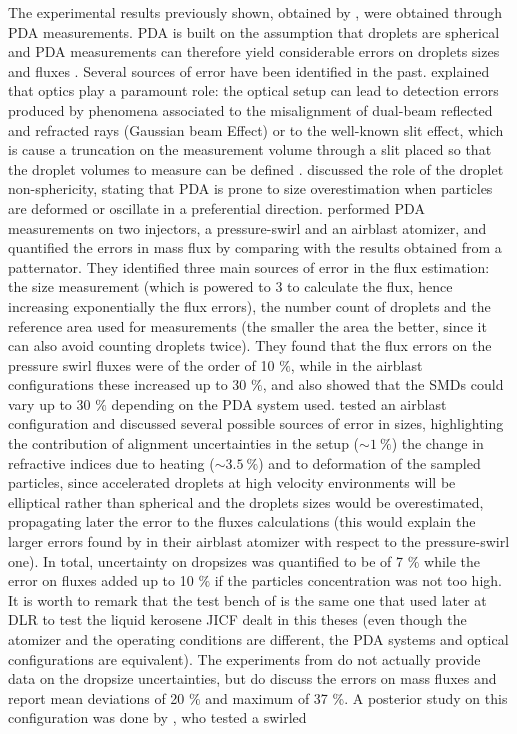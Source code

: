 The experimental results previously shown, obtained by , were obtained through PDA measurements. PDA is built on the assumption that droplets are spherical and PDA measurements can therefore yield considerable errors on droplets sizes and fluxes . Several sources of error have been identified in the past.  explained that optics play a paramount role: the optical setup can lead to detection errors produced by phenomena associated to the misalignment of dual-beam reflected and refracted rays (Gaussian beam Effect) or to the well-known slit effect, which is cause a truncation on the measurement volume through a slit placed so that the droplet volumes to measure can be defined .  discussed the role of the droplet non-sphericity, stating that PDA is prone to size overestimation when particles are deformed or oscillate in a preferential direction.  performed PDA measurements on two injectors, a pressure-swirl and an airblast atomizer, and quantified the errors in mass flux by comparing with the results obtained from a patternator. They identified three main sources of error in the flux estimation: the size measurement (which is powered to 3 to calculate the flux, hence increasing exponentially the flux errors), the number count of droplets and the reference area used for measurements (the smaller the area the better, since it can also avoid counting droplets twice). They found that the flux errors on the pressure swirl fluxes were of the order of 10 $\%$, while in the airblast configurations these increased up to 30 $\%$, and also showed that the SMDs could vary up to 30 $\%$ depending on the PDA system used.  tested an airblast configuration and discussed several possible sources of error in sizes, highlighting the contribution of alignment uncertainties in the setup ($\sim 1~\%$) the change in refractive indices due to heating ($\sim 3.5~\%$) and to deformation of the sampled particles, since accelerated droplets at high velocity environments will be elliptical rather than spherical and the droplets sizes would be overestimated, propagating later the error to the fluxes calculations (this would explain the larger errors found by  in their airblast atomizer with respect to the pressure-swirl one). In total, uncertainty on dropsizes was quantified to be of 7 $\%$ while the error on fluxes added up to 10 $\%$ if the particles concentration was not too high. It is worth to remark that the test bench of  is the same one that  used later at DLR to test the liquid kerosene JICF dealt in this theses (even though the atomizer and the operating conditions are different, the PDA systems and optical configurations are equivalent). The experiments from  do not actually provide data on the dropsize uncertainties, but do discuss the errors on mass fluxes and report mean deviations of 20 $\%$ and maximum of 37 $\%$. A posterior study on this configuration was done by , who tested a swirled 
